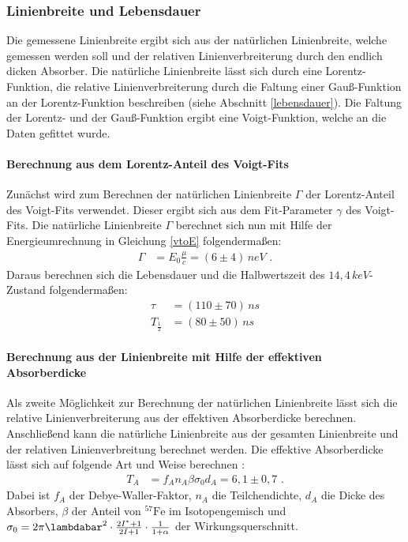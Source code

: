 \subsubsection{Linienbreite und Lebensdauer}
Die gemessene Linienbreite ergibt sich aus der natürlichen Linienbreite, welche gemessen werden soll und der relativen Linienverbreiterung durch den endlich dicken Absorber. Die natürliche Linienbreite lässt sich durch eine Lorentz-Funktion, die relative Linienverbreiterung durch die Faltung einer Gauß-Funktion an der Lorentz-Funktion beschreiben (siehe Abschnitt \ref{lebensdauer}). Die Faltung der Lorentz- und der Gauß-Funktion ergibt eine Voigt-Funktion, welche an die Daten gefittet wurde.
\paragraph{Berechnung aus dem Lorentz-Anteil des Voigt-Fits}
Zunächst wird zum Berechnen der natürlichen Linienbreite $\Gamma$ der Lorentz-Anteil des Voigt-Fits verwendet. Dieser ergibt sich aus dem Fit-Parameter $\gamma$ des Voigt-Fits. Die natürliche Linienbreite $\Gamma$ berechnet sich nun mit Hilfe der Energieumrechnung in Gleichung \ref{vtoE} folgendermaßen:
\begin{align}
	\Gamma&=E_0\frac{\mu}{c}=(6\pm4)\,\si{neV}\text{ .}
\end{align}
Daraus berechnen sich die Lebensdauer und die Halbwertszeit des $14,4\,\si{keV}$-Zustand folgendermaßen:
\begin{align}
	\tau&=(110\pm70)\,\si{ns}\\
	T_{\frac12}&=(80\pm50)\,\si{ns}
\end{align}
\paragraph{Berechnung aus der Linienbreite mit Hilfe der effektiven Absorberdicke}
Als zweite Möglichkeit zur Berechnung der natürlichen Linienbreite lässt sich die relative Linienverbreiterung aus der effektiven Absorberdicke berechnen. Anschließend kann die natürliche Linienbreite aus der gesamten Linienbreite und der relativen Linienverbreitung berechnet werden. Die effektive Absorberdicke lässt sich auf folgende Art und Weise berechnen \cite{anleitung}:
\begin{align}
	T_A&=f_An_A\beta\sigma_0d_A=6,1\pm0,7\text{ .}
\end{align}
Dabei ist $f_A$ der Debye-Waller-Faktor, $n_A$ die Teilchendichte, $d_A$ die Dicke des Absorbers, $\beta$ der Anteil von $^{57}\mathrm{Fe}$ im Isotopengemisch und $\sigma_0=2\pi\lambdabar^2\cdot\frac{2I^*+1}{2I+1}\cdot\frac1{1+\alpha}$ der Wirkungsquerschnitt.
